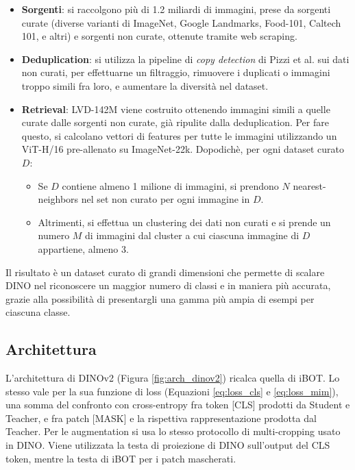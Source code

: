 \begin{itemize}
    \item \textbf{Sorgenti}: si raccolgono più di 1.2 miliardi di immagini, prese da sorgenti curate (diverse varianti di ImageNet, Google Landmarks, Food-101, Caltech 101, e altri) e sorgenti non curate, ottenute tramite web scraping.
    \item \textbf{Deduplication}: si utilizza la pipeline di \textit{copy detection} di Pizzi et al. \cite{deduplication} sui dati non curati, per effettuarne un filtraggio, rimuovere i duplicati o immagini troppo simili fra loro, e aumentare la diversità nel dataset.
    \item \textbf{Retrieval}: LVD-142M viene costruito ottenendo immagini simili a quelle curate dalle sorgenti non curate, già ripulite dalla deduplication. Per fare questo, si calcolano vettori di features per tutte le immagini utilizzando un ViT-H/16 pre-allenato su ImageNet-22k. Dopodichè, per ogni dataset curato \(D\):
    \begin{itemize}
        \item Se \(D\) contiene almeno 1 milione di immagini, si prendono \(N\) nearest-neighbors nel set non curato per ogni immagine in \(D\).
        \item Altrimenti, si effettua un clustering dei dati non curati e si prende un numero \(M\) di immagini dal cluster a cui ciascuna immagine di \(D\) appartiene, almeno 3.
    \end{itemize}
\end{itemize}

Il risultato è un dataset curato di grandi dimensioni che permette di scalare DINO nel riconoscere un maggior numero di classi e in maniera più accurata, grazie alla possibilità di presentargli una gamma più ampia di esempi per ciascuna classe.

\subsection{Architettura}
L'architettura di DINOv2 (Figura \ref{fig:arch_dinov2}) ricalca quella di iBOT. Lo stesso vale per la sua funzione di loss (Equazioni \ref{eq:loss_cls} e \ref{eq:loss_mim}), una somma del confronto con cross-entropy fra token [CLS] prodotti da Student e Teacher, e fra patch [MASK] e la rispettiva rappresentazione prodotta dal Teacher. Per le augmentation si usa lo stesso protocollo di multi-cropping usato in DINO. Viene utilizzata la testa di proiezione di DINO sull'output del CLS token, mentre la testa di iBOT per i patch mascherati.

